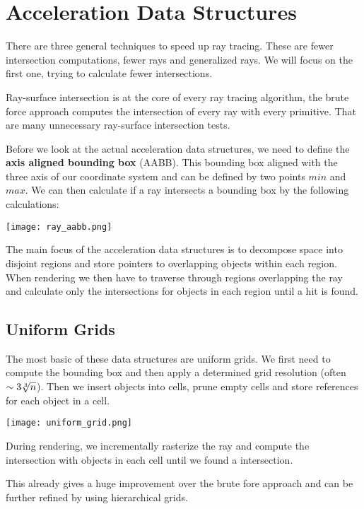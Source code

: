 \section{Acceleration Data Structures}

There are three general techniques to speed up ray tracing. These are fewer intersection computations, fewer rays and generalized rays. We will focus on the first one, trying to calculate fewer intersections. \medskip

Ray-surface intersection is at the core of every ray tracing algorithm, the brute force approach computes the intersection of every ray with every primitive. That are many unnecessary ray-surface intersection tests. \medskip

Before we look at the actual acceleration data structures, we need to define the \textbf{axis aligned bounding box} (AABB). This bounding box aligned with the three axis of our coordinate system and can be defined by two points $min$ and $max$. We can then calculate if a ray intersects a bounding box by the following calculations:
\begin{center}
	\texttt{[image: ray\_aabb.png]}
\end{center}

The main focus of the acceleration data structures is to decompose space into disjoint regions and store pointers to overlapping objects within each region. When rendering we then have to traverse through regions overlapping the ray and calculate only the intersections for objects in each region until a hit is found.


\subsection{Uniform Grids}

The most basic of these data structures are uniform grids. We first need to compute the bounding box and then apply a determined grid resolution (often $\sim 3 \root 3 \of n$). Then we insert objects into cells, prune empty cells and store references for each object in a cell.
\begin{center}
	\texttt{[image: uniform\_grid.png]}
\end{center}

During rendering, we incrementally rasterize the ray and compute the intersection with objects in each cell until we found a intersection. \medskip

This already gives a huge improvement over the brute fore approach and can be further refined by using hierarchical grids.



